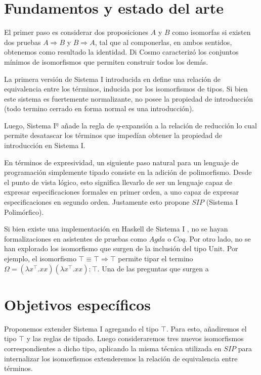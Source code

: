 \documentclass[a4paper,10pt]{article}
\begin{document}
\section{Fundamentos y estado del arte}

El primer paso es considerar dos proposiciones $A$ y $B$ como isomorfas si existen dos pruebas $A \Rightarrow B$ y $B \Rightarrow A$, tal que al componerlas, en ambos sentidos, obtenemos como resultado la identidad. Di Cosmo \cite{dicosmo} caracterizó los conjuntos mínimos de isomorfismos que permiten construir todos los demás.

La primera versión de Sistema I introducida en \cite{sistema-i} define una relación de equivalencia entre los términos, inducida por los isomorfismos de tipos. Si bien este sistema es fuertemente normalizante, no posee la propiedad de introducción (todo termino cerrado  en forma normal es una introducción).

Luego, Sistema I$^\eta$ \cite{sistema-in} añade la regla de $\eta$-expansión a la relación de reducción lo cual permite desatascar los términos que impedían obtener la propiedad de introducción en Sistema I.

En términos de expresividad, un siguiente paso natural para un lenguaje de programación simplemente tipado consiste en la adición de polimorfismo. Desde el punto de vista lógico, esto significa llevarlo de ser un lenguaje capaz de expresar especificaciones formales en primer orden, a uno capaz de expresar especificaciones en segundo orden. Justamente esto propone $SIP$ \cite{sistema-ip} (Sistema I Polimórfico).

Si bien existe una implementación en Haskell de Sistema I \cite{lambda+}, no se hayan formalizaciones en asistentes de pruebas como $Agda$ o $Coq$. Por otro lado, no se han explorado los isomorfismo que surgen de la inclusión del tipo Unit. Por ejemplo, el isomorfismo $\top \equiv \top \Rightarrow \top$ permite tipar el termino $\Omega = (\lambda x^\top.xx)(\lambda x^\top.xx) : \top$. Una de las preguntas que surgen a 

\section{Objetivos específicos}

Proponemos extender Sistema I agregando el tipo $\top$. Para esto, añadiremos el tipo $\top$ y las reglas de tipado. Luego consideraremos tres nuevos isomorfismos correspondientes a dicho tipo, aplicando la misma técnica utilizada en $SIP$ para internalizar los isomorfismos extenderemos la relación de equivalencia entre términos.
\end{document}
